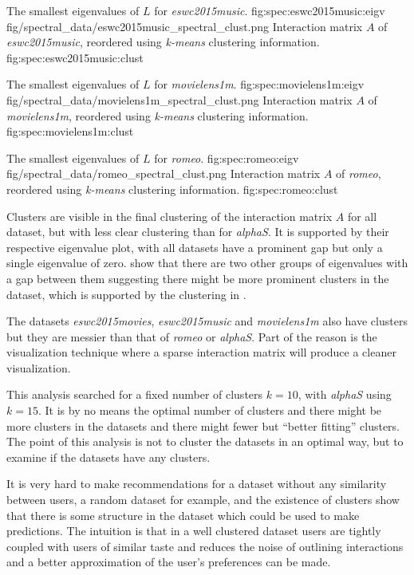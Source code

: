 {The smallest eigenvalues of $L$ for \textit{eswc2015music}.}
{fig:spec:eswc2015music:eigv}
{fig/spectral_data/eswc2015music_spectral_clust.png}
{Interaction matrix $A$ of \textit{eswc2015music}, reordered using \textit{k-means} clustering information.}
{fig:spec:eswc2015music:clust}

{The smallest eigenvalues of $L$ for \textit{movielens1m}.}
{fig:spec:movielens1m:eigv}
{fig/spectral_data/movielens1m_spectral_clust.png}
{Interaction matrix $A$ of \textit{movielens1m}, reordered using \textit{k-means} clustering information.}
{fig:spec:movielens1m:clust}

\FloatBarrier

{The smallest eigenvalues of $L$ for \textit{romeo}.}
{fig:spec:romeo:eigv}
{fig/spectral_data/romeo_spectral_clust.png}
{Interaction matrix $A$ of \textit{romeo}, reordered using \textit{k-means} clustering information.}
{fig:spec:romeo:clust}


\newpage

Clusters are visible in the final clustering of the interaction matrix $A$ for all dataset, but with less clear clustering than for \textit{alphaS}. It is supported by their respective eigenvalue plot, with all datasets have a prominent gap but only a single eigenvalue of zero.  show that there are two other groups of eigenvalues with a gap between them suggesting there might be more prominent clusters in the dataset, which is supported by the clustering in .

The datasets \textit{eswc2015movies}, \textit{eswc2015music} and \textit{movielens1m} also have clusters but they are messier than that of \textit{romeo} or \textit{alphaS}. Part of the reason is the visualization technique where a sparse interaction matrix will produce a cleaner visualization.

This analysis searched for a fixed number of clusters $k = 10$, with \textit{alphaS} using $k = 15$. It is by no means the optimal number of clusters and there might be more clusters in the datasets and there might fewer but ``better fitting'' clusters. The point of this analysis is not to cluster the datasets in an optimal way, but to examine if the datasets have any clusters.

It is very hard to make recommendations for a dataset without any similarity between users, a random dataset for example, and the existence of clusters show that there is some structure in the dataset which could be used to make predictions. The intuition is that in a well clustered dataset users are tightly coupled with users of similar taste and reduces the noise of outlining interactions and a better approximation of the user's preferences can be made.

